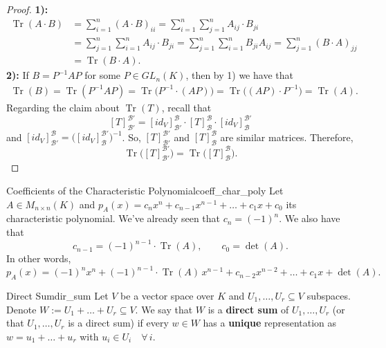 \begin{proof}
	\textbf{1):}
	\begin{align*}
		\operatorname{Tr}(A \cdot B) &= \sum_{i=1}^{n} (A \cdot B)_{ii} = \sum_{i=1}^{n} \sum_{j=1}^{n} A_{ij} \cdot B_{ji}\\
		&= \sum_{j=1}^{n} \sum_{i=1}^{n} A_{ij} \cdot B_{ji} = \sum_{j=1}^{n} \sum_{i=1}^{n} B_{ji} A_{ij} = \sum_{j=1}^{n} (B \cdot A)_{jj}\\
		&= \operatorname{Tr}(B \cdot A).
	\end{align*}
	\textbf{2):} If $B = P^{-1}AP$ for some $P \in GL_n(K)$, then by 1) we have that
	\begin{align*}
		\operatorname{Tr}(B) = \operatorname{Tr}(P^{-1}AP) = \operatorname{Tr}\big(P^{-1}\cdot (AP)\big) = \operatorname{Tr}\big((AP) \cdot P^{-1}\big) = \operatorname{Tr}(A).
	\end{align*}
	Regarding the claim about $\operatorname{Tr}(T)$, recall that
	\begin{equation}
		\label{eq:trace_1}
		[T]^{\mathcal{B}'}_{\mathcal{B}'} = [id_V]^{\mathcal{B}}_{\mathcal{B}'} \cdot [T]^{\mathcal{B}}_{\mathcal{B}} \cdot [id_V]^{\mathcal{B}'}_{\mathcal{B}}
	\end{equation}
	and $[id_V]^{\mathcal{B}}_{\mathcal{B}'} = \big([id_V]^{\mathcal{B}'}_{\mathcal{B}}\big)^{-1}$. So, $[T]^{\mathcal{B}'}_{\mathcal{B}'}$ and $[T]^{\mathcal{B}}_{\mathcal{B}}$ are similar matrices. Therefore,
	\[
		\operatorname{Tr}\big([T]^{\mathcal{B}'}_{\mathcal{B}'}\big) = \operatorname{Tr}\big([T]^{\mathcal{B}}_{\mathcal{B}}\big).
	\]
\end{proof}

\begin{lemma}{Coefficients of the Characteristic Polynomial}{coeff_char_poly}
	Let $A \in M_{n \times n}(K)$ and $p_A(x) = c_n x^n + c_{n-1}x^{n-1} + \hdots + c_1 x + c_0$ its characteristic polynomial. We've already seen that $c_n = (-1)^n$. We also have that
	\[
		c_{n-1} = (-1)^{n-1} \cdot \operatorname{Tr}(A), \qquad c_0 = \det(A).
	\]
	In other words,
	\[
		p_A(x) = (-1)^n x^n + (-1)^{n-1} \cdot \operatorname{Tr}(A)\,  x^{n-1} + c_{n-2} x^{n-2} + \hdots + c_1 x + \det(A).
	\]
\end{lemma}

\begin{definition}{Direct Sum}{dir_sum}
	Let $V$ be a vector space over $K$ and $U_1, \hdots , U_r \subseteq V$ subspaces. Denote $W := U_1 + \hdots + U_r \subseteq V$. We say that $W$ is a \textbf{direct sum} of $U_1, \hdots , U_r$ (or that $U_1, \hdots , U_r$ is a direct sum) if every $w \in W$ has a \textbf{unique} representation as $w = u_1 + \hdots + u_r$ with $u_i \in U_i \quad \forall \, i$.
\end{definition}

